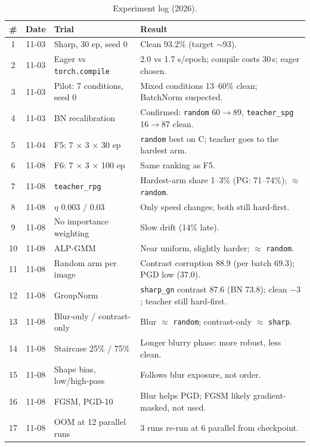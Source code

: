 \documentclass[a4paper,12pt]{report}
\newcommand{\cond}[1]{\texttt{#1}}
\begin{document}
\begin{table}[htbp]
\caption{Experiment log (2026).}
\label{tab:log}
\begin{center}
\scriptsize
\renewcommand{\arraystretch}{1.15}
\begin{tabular}{|c|c|P{3.8cm}|P{7.8cm}|} \hline
\textbf{\#} & \textbf{Date} & \textbf{Trial} & \textbf{Result} \\  & 11-03 & Sharp, 30 ep, seed 0 & Clean 93.2\% (target $\sim$93). \\
2 & 11-03 & Eager vs \texttt{torch.compile} & 2.0 vs 1.7 s/epoch; compile costs 30\,s; eager chosen. \\
3 & 11-03 & Pilot: 7 conditions, seed 0 & Mixed conditions 13--60\% clean; BatchNorm suspected. \\
4 & 11-03 & BN recalibration & Confirmed: \cond{random} 60$\to$89, \cond{teacher\_spg} 16$\to$87 clean. \\
5 & 11-04 & F5: 7 $\times$ 3 $\times$ 30 ep & \cond{random} best on C; teacher goes to the hardest arm. \\
6 & 11-08 & F6: 7 $\times$ 3 $\times$ 100 ep & Same ranking as F5. \\
7 & 11-08 & \cond{teacher\_rpg} & Hardest-arm share 1--3\% (PG: 71--74\%); $\approx$ \cond{random}. \\
8 & 11-08 & $\eta$ 0.003 / 0.03 & Only speed changes; both still hard-first. \\
9 & 11-08 & No importance weighting & Slow drift (14\% late). \\
10 & 11-08 & ALP-GMM & Near uniform, slightly harder; $\approx$ \cond{random}. \\
11 & 11-08 & Random arm per image & Contrast corruption 88.9 (per batch 69.3); PGD low (37.0). \\
12 & 11-08 & GroupNorm & \cond{sharp\_gn} contrast 87.6 (BN 73.8); clean $-3$; teacher still hard-first. \\
13 & 11-08 & Blur-only / contrast-only & Blur $\approx$ \cond{random}; contrast-only $\approx$ \cond{sharp}. \\
14 & 11-08 & Staircase 25\% / 75\% & Longer blurry phase: more robust, less clean. \\
15 & 11-08 & Shape bias, low/high-pass & Follows blur exposure, not order. \\
16 & 11-08 & FGSM, PGD-10 & Blur helps PGD; FGSM likely gradient-masked, not used. \\
17 & 11-08 & OOM at 12 parallel runs & 3 runs re-run at 6 parallel from checkpoint. \\ \hline
\end{tabular}
\end{center}
\end{table}
\end{document}
